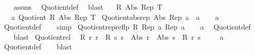 \begin{isabellebody}
%
\isadelimproof
\ \ %
\endisadelimproof
%
\isatagproof
{}\isamarkupfalse%
\ assms\ \isamarkupfalse%
\ Quotient{\isacharunderscore}{\kern0pt}def\ \isamarkupfalse%
\ blast%
\endisatagproof
{\isafoldproof}%
%
\isadelimproof
\isanewline
%
\endisadelimproof
\isanewline
{}\isamarkupfalse%
\isanewline
\ \ \ R\ Abs\ Rep\ T\isanewline
\ \ \ a{\isacharcolon}{\kern0pt}\ {\isachardoublequoteopen}Quotient\ R\ Abs\ Rep\ T{\isachardoublequoteclose}\isanewline
{}\isanewline
\isanewline
{}\isamarkupfalse%
\ Quotient{\isacharunderscore}{\kern0pt}abs{\isacharunderscore}{\kern0pt}rep{\isacharcolon}{\kern0pt}\ {\isachardoublequoteopen}Abs\ {\isacharparenleft}{\kern0pt}Rep\ a{\isacharparenright}{\kern0pt}\ {\isacharequal}{\kern0pt}\ a{\isachardoublequoteclose}\isanewline
%
\isadelimproof
\ \ %
\endisadelimproof
%
\isatagproof
{}\isamarkupfalse%
\ a\ \isamarkupfalse%
\ Quotient{\isacharunderscore}{\kern0pt}def\isanewline
\ \ \isamarkupfalse%
\ simp%
\endisatagproof
{\isafoldproof}%
%
\isadelimproof
\isanewline
%
\endisadelimproof
\isanewline
{}\isamarkupfalse%
\ Quotient{\isacharunderscore}{\kern0pt}rep{\isacharunderscore}{\kern0pt}reflp{\isacharcolon}{\kern0pt}\ {\isachardoublequoteopen}R\ {\isacharparenleft}{\kern0pt}Rep\ a{\isacharparenright}{\kern0pt}\ {\isacharparenleft}{\kern0pt}Rep\ a{\isacharparenright}{\kern0pt}{\isachardoublequoteclose}\isanewline
%
\isadelimproof
\ \ %
\endisadelimproof
%
\isatagproof
{}\isamarkupfalse%
\ a\ \isamarkupfalse%
\ Quotient{\isacharunderscore}{\kern0pt}def\isanewline
\ \ \isamarkupfalse%
\ blast%
\endisatagproof
{\isafoldproof}%
%
\isadelimproof
\isanewline
%
\endisadelimproof
\isanewline
{}\isamarkupfalse%
\ Quotient{\isacharunderscore}{\kern0pt}rel{\isacharcolon}{\kern0pt}\isanewline
\ \ {\isachardoublequoteopen}R\ r\ r\ {\isasymand}\ R\ s\ s\ {\isasymand}\ Abs\ r\ {\isacharequal}{\kern0pt}\ Abs\ s\ {\isasymlongleftrightarrow}\ R\ r\ s{\isachardoublequoteclose}\ %
\isanewline
%
\isadelimproof
\ \ %
\endisadelimproof
%
\isatagproof
{}\isamarkupfalse%
\ a\ \isamarkupfalse%
\ Quotient{\isacharunderscore}{\kern0pt}def\isanewline
\ \ \isamarkupfalse%
\ blast%
\endisatagproof
{\isafoldproof}%
%
\isadelimproof
\isanewline
%
\endisadelimproof
\isanewline
{}\isamarkupfalse%

\end{isabellebody}
